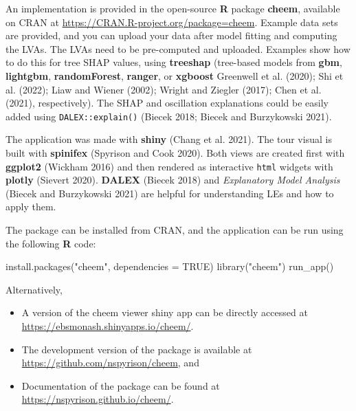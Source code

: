 \documentclass[
]{article}
\newenvironment{Shaded}{\begin{snugshade}}{\end{snugshade}}
\newcommand{\AttributeTok}[1]{\textcolor[rgb]{0.77,0.63,0.00}{#1}}
\newcommand{\ConstantTok}[1]{\textcolor[rgb]{0.00,0.00,0.00}{#1}}
\newcommand{\FunctionTok}[1]{\textcolor[rgb]{0.00,0.00,0.00}{#1}}
\newcommand{\NormalTok}[1]{#1}
\newcommand{\StringTok}[1]{\textcolor[rgb]{0.31,0.60,0.02}{#1}}
\providecommand{\tightlist}{%
  \setlength{\itemsep}{0pt}\setlength{\parskip}{0pt}}
\begin{document}
An implementation is provided in the open-source \textbf{R} package \textbf{cheem}, available on CRAN at \url{https://CRAN.R-project.org/package=cheem}. Example data sets are provided, and you can upload your data after model fitting and computing the LVAs. The LVAs need to be pre-computed and uploaded. Examples show how to do this for tree SHAP values, using \textbf{treeshap} (tree-based models from \textbf{gbm}, \textbf{lightgbm}, \textbf{randomForest}, \textbf{ranger}, or \textbf{xgboost} Greenwell et al. (2020); Shi et al. (2022); Liaw and Wiener (2002); Wright and Ziegler (2017); Chen et al. (2021), respectively). The SHAP and oscillation explanations could be easily added using \texttt{DALEX::explain()} (Biecek 2018; Biecek and Burzykowski 2021).

The application was made with \textbf{shiny} (Chang et al. 2021). The tour visual is built with \textbf{spinifex} (Spyrison and Cook 2020). Both views are created first with \textbf{ggplot2} (Wickham 2016) and then rendered as interactive \texttt{html} widgets with \textbf{plotly} (Sievert 2020). \textbf{DALEX} (Biecek 2018) and \emph{Explanatory Model Analysis} (Biecek and Burzykowski 2021) are helpful for understanding LEs and how to apply them.

The package can be installed from CRAN, and the application can be run using the following \textbf{R} code:

\begin{Shaded}
\begin{Highlighting}[]
\FunctionTok{install.packages}\NormalTok{(}\StringTok{"cheem"}\NormalTok{, }\AttributeTok{dependencies =} \ConstantTok{TRUE}\NormalTok{)}
\FunctionTok{library}\NormalTok{(}\StringTok{"cheem"}\NormalTok{)}
\FunctionTok{run\_app}\NormalTok{()}
\end{Highlighting}
\end{Shaded}

Alternatively,

\begin{itemize}
\tightlist
\item
  A version of the cheem viewer shiny app can be directly accessed at
  \url{https://ebsmonash.shinyapps.io/cheem/}.
\item
  The development version of the package is available at \url{https://github.com/nspyrison/cheem}, and
\item
  Documentation of the package can be found at \url{https://nspyrison.github.io/cheem/}.
\end{itemize}
\end{document}
